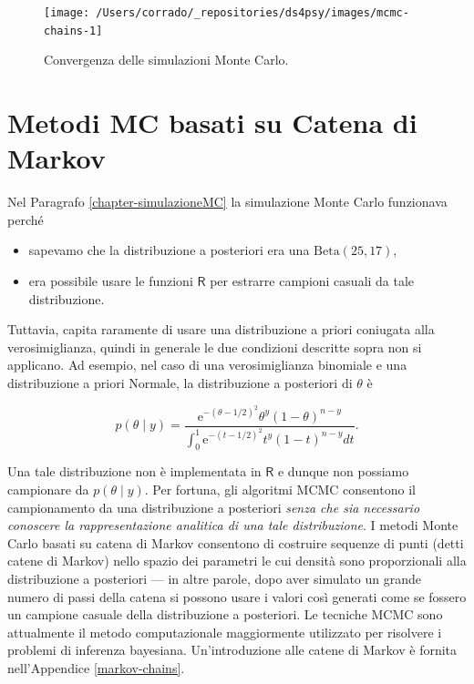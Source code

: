 \documentclass[
  11pt,
]{krantz}
\providecommand{\tightlist}{%
  \setlength{\itemsep}{0pt}\setlength{\parskip}{0pt}}
\newcommand{\R}{\textsf{R}} %
\theoremstyle{definition}
\theoremstyle{definition}
\theoremstyle{definition}
\theoremstyle{definition}
\theoremstyle{remark}
\begin{document}
\begin{figure}[h]

{\centering \texttt{[image: /Users/corrado/\_repositories/ds4psy/images/mcmc-chains-1]} 

}

\caption{Convergenza delle simulazioni Monte Carlo.}\label{fig:mcmc-chains-1}
\end{figure}

\hypertarget{metodi-mc-basati-su-catena-di-markov}{%
\section{Metodi MC basati su Catena di Markov}\label{metodi-mc-basati-su-catena-di-markov}}

Nel Paragrafo \ref{chapter-simulazioneMC} la simulazione Monte Carlo funzionava perché

\begin{itemize}
\tightlist
\item
  sapevamo che la distribuzione a posteriori era una \(\mbox{Beta}(25, 17)\),
\item
  era possibile usare le funzioni \(\R\) per estrarre campioni casuali da tale distribuzione.
\end{itemize}

Tuttavia, capita raramente di usare una distribuzione a priori coniugata alla verosimiglianza, quindi in generale le due condizioni descritte sopra non si applicano. Ad esempio, nel caso di una verosimiglianza binomiale e una distribuzione a priori Normale, la distribuzione a posteriori di \(\theta\) è

\[
p(\theta \mid y) = \frac{\mathrm{e}^{-(\theta - 1 / 2)^2} \theta^y (1 - \theta)^{n - y}} {\int_0^1 \mathrm{e}^{-(t - 1 / 2)^2} t^y (1 - t)^{n - y} dt}.
\]

Una tale distribuzione non è implementata in \(\R\) e dunque non possiamo campionare da \(p(\theta \mid y)\). Per fortuna, gli algoritmi MCMC consentono il campionamento da una distribuzione a posteriori \emph{senza che sia necessario conoscere la rappresentazione analitica di una tale distribuzione}. I metodi Monte Carlo basati su catena di Markov consentono di costruire sequenze di punti (detti catene di Markov) nello spazio dei parametri le cui densità sono proporzionali alla distribuzione a posteriori --- in altre parole, dopo aver simulato un grande numero di passi della catena si possono usare i valori così generati come se fossero un campione casuale della distribuzione a posteriori. Le tecniche MCMC sono attualmente il metodo computazionale maggiormente utilizzato per risolvere i problemi di inferenza bayesiana. Un'introduzione alle catene di Markov è fornita nell'Appendice \ref{markov-chains}.
\end{document}
